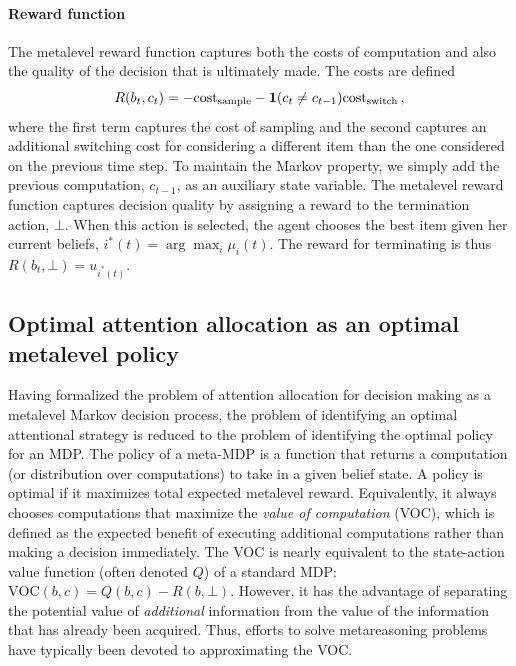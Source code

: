 \documentclass[12pt,a4paperpaper,]{article}
\begin{document}
\paragraph{Reward function}
The metalevel reward function captures both the costs of computation and also the quality of the decision that is ultimately made. The costs are defined
%
\begin{equation}
R(b_t, c_t) = -\text{cost}_\text{sample} - \mathbf{1}(c_t \neq c_{t-1}) \text{cost}_\text{switch}
\,,
\end{equation}
%
where the first term captures the cost of sampling and the second captures an additional switching cost for considering a different item than the one considered on the previous time step. To maintain the Markov property, we simply add the previous computation, $c_{t-1}$, as an auxiliary state variable.
The metalevel reward function captures decision quality by assigning a reward to the termination action, $\bot$. When this action is selected, the agent chooses the best item given her current beliefs, $i^*(t) = \arg\max_i \mu_i(t)$.
The reward for terminating is thus $R(b_t, \bot) = u_{i^*(t)}$.


\subsection{Optimal attention allocation as an optimal metalevel policy}
Having formalized the problem of attention allocation for decision making as a metalevel Markov decision process, the problem of identifying an optimal attentional strategy is reduced to the problem of identifying the optimal policy for an MDP. The policy of a meta-MDP is a function that returns a computation (or distribution over computations) to take in a given belief state. A policy is optimal if it maximizes total expected metalevel reward. Equivalently, it always chooses computations that maximize the \emph{value of computation} (VOC), which is defined as the expected benefit of executing additional computations rather than making a decision immediately.
The VOC is nearly equivalent to the state-action value function (often denoted $Q$) of a standard MDP: $\text{VOC}(b, c) = Q(b, c) - R(b, \bot)$. However, it has the advantage of separating the potential value of \emph{additional} information from the value of the information that has already been acquired. Thus, efforts to solve metareasoning problems have typically been devoted to approximating the VOC.
\end{document}
